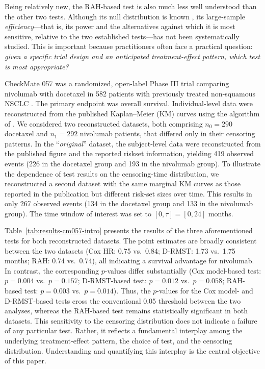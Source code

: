 \documentclass[12pt]{article}
\begin{document}
Being relatively new, the RAH-based test is also much less well understood than the other two tests. Although its null distribution is known \citep{Uno2023}, its large-sample \emph{efficiency}—that is, its power and the alternatives against which it is most sensitive, relative to the two established tests—has not been systematically studied. This is important because practitioners often face a practical question: \emph{given a specific trial design and an anticipated treatment-effect pattern, which test is most appropriate?}



CheckMate 057 was a randomized, open-label Phase III trial comparing nivolumab with docetaxel in 582 patients with previously treated non-squamous NSCLC \citep{Borghaei2015}. The primary endpoint was overall survival. Individual-level data were reconstructed from the published Kaplan--Meier (KM) curves using the algorithm of \cite{Guyot2012}.
We considered two reconstructed datasets, both comprising $n_0=290$ docetaxel and $n_1=292$ nivolumab patients, that differed only in their censoring patterns. In the ``\emph{original}'' dataset, the subject-level data were reconstructed from the published figure and the reported riskset information, yielding 419 observed events (226 in the docetaxel group and 193 in the nivolumab group). To illustrate the dependence of test results on the censoring-time distribution, we reconstructed a second dataset with the same marginal KM curves as those reported in the publication but different risk-set sizes over time. This results in only 267 observed events (134 in the docetaxel group and 133 in the nivolumab group). The time window of interest was set to $[0,\tau]=[0,24]$ months.


Table~\ref{tab:results-cm057-intro} presents the results of the three aforementioned tests for both reconstructed datasets. The point estimates are broadly consistent between the two datasets (Cox HR: 0.75 vs.\ 0.84; D-RMST: 1.73 vs.\ 1.75 months; RAH: 0.74 vs.\ 0.74), all indicating a survival advantage for nivolumab. In contrast, the corresponding $p$-values differ substantially (Cox model-based test: $p=0.004$ vs.\ $p=0.157$; D-RMST-based test: $p=0.012$ vs.\ $p=0.058$; RAH-based test: $p=0.003$ vs.\ $p=0.014$). Thus, the $p$-values for the Cox model- and D-RMST-based tests cross the conventional 0.05 threshold between the two analyses, whereas the RAH-based test remains statistically significant in both datasets. This sensitivity to the censoring distribution does not indicate a failure of any particular test. Rather, it reflects a fundamental interplay among the underlying treatment-effect pattern, the choice of test, and the censoring distribution. Understanding and quantifying this interplay is the central objective of this paper.
\end{document}
